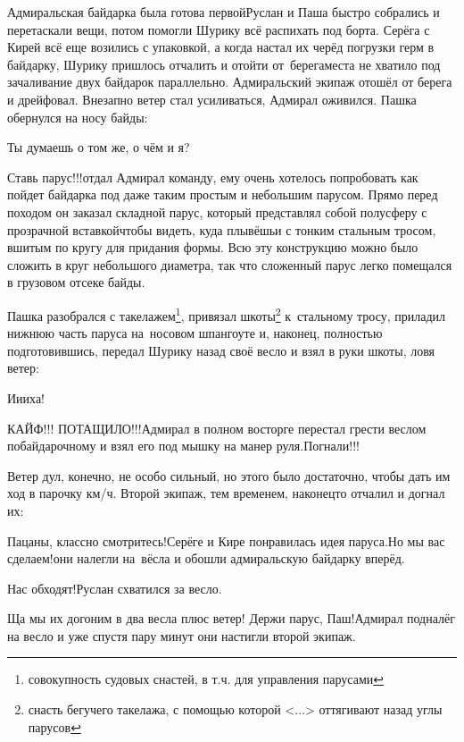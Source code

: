 Адмиральская байдарка была готова первой\mdash Руслан и Паша быстро собрались и перетаскали вещи, потом помогли Шурику всё распихать под борта. Серёга с Кирей всё еще возились с упаковкой, а когда настал их черёд погрузки герм в байдарку, Шурику пришлось отчалить и отойти от~берега\mdash места не хватило под зачаливание двух байдарок параллельно. Адмиральский экипаж отошёл от берега и дрейфовал. Внезапно ветер стал усиливаться, Адмирал оживился. Пашка обернулся на носу байды:

\diagdash Ты думаешь о том же, о чём и я?

\diagdash Ставь парус!!!\mdash отдал Адмирал команду, ему очень хотелось попробовать как пойдет байдарка под даже таким простым и небольшим парусом. Прямо перед походом он заказал складной парус, который представлял собой полусферу с прозрачной вставкой\mdash чтобы видеть, куда плывёшь\mdash и с тонким стальным тросом, вшитым по кругу для придания формы. Всю эту конструкцию можно было сложить в круг небольшого диаметра, так что сложенный парус легко помещался в грузовом отсеке байды.

\renewcommand*{\thefootnote}{\arabic{footnote}}
Пашка разобрался с такелажем\footnote{совокупность судовых снастей, в т.ч. для управления парусами\cite{МорскойСправочник}}, привязал шкоты\footnote{снасть бегучего такелажа, с помощью которой <...> оттягивают назад углы парусов\cite{МорскойСправочник}} к~стальному тросу, приладил нижнюю часть паруса на~носовом шпангоуте и, наконец, полностью подготовившись, передал Шурику назад своё весло и взял в руки шкоты, ловя ветер:

\diagdash И\sdash и\sdash иха! 

\diagdash КАЙФ!!! ПОТАЩИЛО!!!\mdash Адмирал в полном восторге перестал грести веслом по\sdash байдарочному и взял его под мышку на манер руля.\mdash Погнали!!!

Ветер дул, конечно, не особо сильный, но этого было достаточно, чтобы дать им ход в парочку км/ч. Второй экипаж, тем временем, наконец\sdash то отчалил и догнал их:

\diagdash Пацаны, классно смотритесь!\mdash Серёге и Кире понравилась идея паруса.\mdash Но мы вас сделаем!\mdash они налегли на~вёсла и обошли адмиральскую байдарку вперёд.

\diagdash Нас обходят!\mdash Руслан схватился за весло.

\diagdash Ща мы их догоним в два весла плюс ветер! Держи парус, Паш!\mdash Адмирал подналёг на весло и уже спустя пару минут они настигли второй экипаж.

